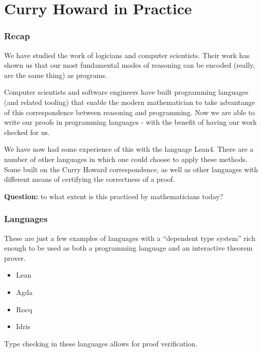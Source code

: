 \documentclass{beamer}
\theoremstyle{indentDefn} \newtheorem{defn}[]{Definition}
\begin{document}
\section{Curry Howard in Practice}
\begin{frame}
	\frametitle{Recap}
	
	We have studied the work of logicians and computer scientists. Their work has shown us that our most fundamental modes of reasoning can be encoded (really, are the same thing) as programs. 
	
	Computer scientists and software engineers have built programming languages (and related tooling) that enable the modern mathematician to take advantange of this correspondence between reasoning and programming. Now we are able to write our proofs in programming languages - with the benefit of having our work checked for us.
	
	We have now had some experience of this with the language Lean4. There are a number of other languages in which one could choose to apply these methods. Some built on the Curry Howard correspondence, as well as other languages with different means of certifying the correctness of a proof.
	
	{\bf Question:} to what extent is this practiced by mathematicians today?	
\end{frame}

\begin{frame}
	\frametitle{Languages}
	
	These are just a few examples of languages with a ``dependent type system'' rich enough to be used as both a programming language and an interactive theorem prover.
	
	\begin{itemize}
		\item[] Lean
		\item[] Agda 
		\item[] Rocq	
		\item[] Idris
	\end{itemize}
	
	Type checking in these languages allows for proof verification.
\end{frame}
\end{document}
